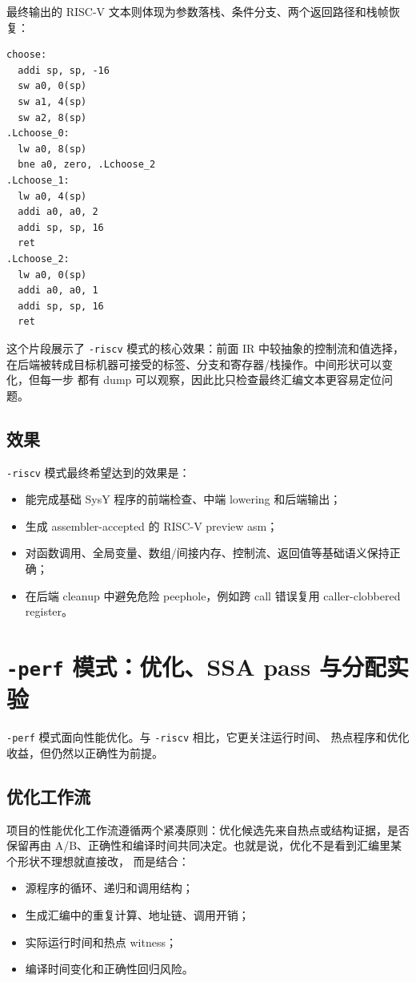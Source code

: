\documentclass[UTF8,a4paper,11pt]{ctexart}
\begin{document}
最终输出的 RISC-V 文本则体现为参数落栈、条件分支、两个返回路径和栈帧恢复：

\begin{lstlisting}[language={}]
choose:
  addi sp, sp, -16
  sw a0, 0(sp)
  sw a1, 4(sp)
  sw a2, 8(sp)
.Lchoose_0:
  lw a0, 8(sp)
  bne a0, zero, .Lchoose_2
.Lchoose_1:
  lw a0, 4(sp)
  addi a0, a0, 2
  addi sp, sp, 16
  ret
.Lchoose_2:
  lw a0, 0(sp)
  addi a0, a0, 1
  addi sp, sp, 16
  ret
\end{lstlisting}

这个片段展示了 \texttt{-riscv} 模式的核心效果：前面 IR 中较抽象的控制流和值选择，
在后端被转成目标机器可接受的标签、分支和寄存器/栈操作。中间形状可以变化，但每一步
都有 dump 可以观察，因此比只检查最终汇编文本更容易定位问题。

\subsection{效果}

\texttt{-riscv} 模式最终希望达到的效果是：

\begin{itemize}
  \item 能完成基础 SysY 程序的前端检查、中端 lowering 和后端输出；
  \item 生成 assembler-accepted 的 RISC-V preview asm；
  \item 对函数调用、全局变量、数组/间接内存、控制流、返回值等基础语义保持正确；
  \item 在后端 cleanup 中避免危险 peephole，例如跨 call 错误复用 caller-clobbered register。
\end{itemize}

\section{\texttt{-perf} 模式：优化、SSA pass 与分配实验}

\texttt{-perf} 模式面向性能优化。与 \texttt{-riscv} 相比，它更关注运行时间、
热点程序和优化收益，但仍然以正确性为前提。

\subsection{优化工作流}

项目的性能优化工作流遵循两个紧凑原则：优化候选先来自热点或结构证据，是否保留再由
A/B、正确性和编译时间共同决定。也就是说，优化不是看到汇编里某个形状不理想就直接改，
而是结合：

\begin{itemize}
  \item 源程序的循环、递归和调用结构；
  \item 生成汇编中的重复计算、地址链、调用开销；
  \item 实际运行时间和热点 witness；
  \item 编译时间变化和正确性回归风险。
\end{itemize}
\end{document}
